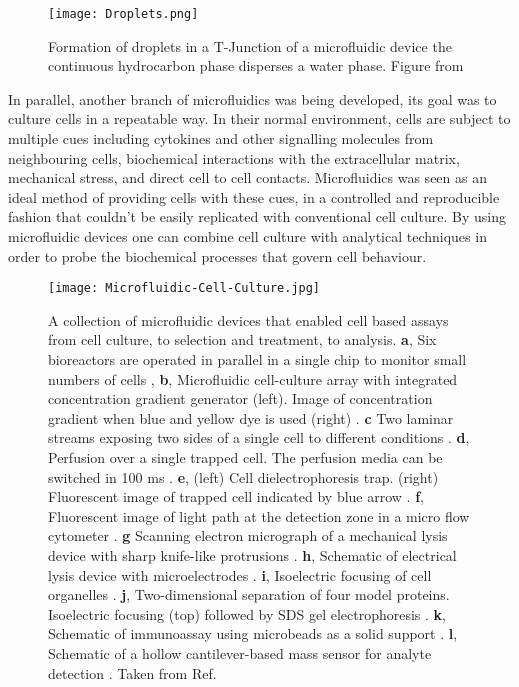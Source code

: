 \begin{figure}
  \texttt{[image: Droplets.png]}
  \caption{Formation of droplets in a T-Junction of a microfluidic device the continuous hydrocarbon
  phase disperses a water phase. Figure from \citep{RN104}}
  \label{fig:IntroDrops}
\end{figure}

In parallel, another branch of microfluidics was being developed, its goal was to
culture cells in a repeatable way. In their normal environment, cells are subject to multiple
cues including cytokines and other signalling molecules from neighbouring cells, biochemical
interactions with the extracellular matrix, mechanical stress, and direct cell to cell contacts.
Microfluidics was seen as an ideal method of providing cells with these cues, in a controlled and reproducible fashion that couldn't be easily
replicated with conventional cell culture. By using microfluidic devices one can combine
cell culture with analytical techniques in order to probe the biochemical processes that
govern cell behaviour.

\begin{figure}
  \begin{center}
  \texttt{[image: Microfluidic-Cell-Culture.jpg]}
  \end{center}
  \caption{A collection of microfluidic devices that enabled cell based assays from cell culture, to selection and treatment,
  to analysis. \textbf{a}, Six bioreactors are operated in parallel in a single chip to monitor small numbers of cells \citep{balagadde2005long},
  \textbf{b}, Microfluidic cell-culture array with integrated concentration gradient generator (left). Image of concentration
  gradient when blue and yellow dye is used (right) \citep{RN41}. \textbf{c} Two laminar streams exposing two sides of a single cell to different
  conditions \citep{takayama2001laminar}.
  \textbf{d}, Perfusion over a single trapped cell. The perfusion media can be switched in 100 ms \citep{wheeler2003microfluidic}. \textbf{e}, (left) Cell dielectrophoresis
  trap. (right) Fluorescent image of trapped cell indicated by blue arrow \citep{Voldman:2002gf}. \textbf{f}, Fluorescent image of light path at the detection
  zone in a micro flow cytometer \citep{wang2004measurements}. \textbf{g} Scanning electron micrograph of a mechanical lysis device with sharp knife-like protrusions \citep{di2003reagentless}.
  \textbf{h}, Schematic of electrical lysis device with microelectrodes \citep{lee1999micro}. \textbf{i}, Isoelectric focusing of cell organelles \citep{lu2004microfabricated}.
  \textbf{j}, Two-dimensional separation of four model proteins. Isoelectric focusing (top) followed by SDS gel electrophoresis \citep{li2004integration}.
  \textbf{k}, Schematic of immunoassay using microbeads as a solid support \citep{sato2002microchip}. \textbf{l}, Schematic of a hollow cantilever-based mass sensor
  for analyte detection \citep{burg2003suspended}. Taken from Ref.\citep{el2006cells}}
  \label{fig:CellCulture}
\end{figure}

